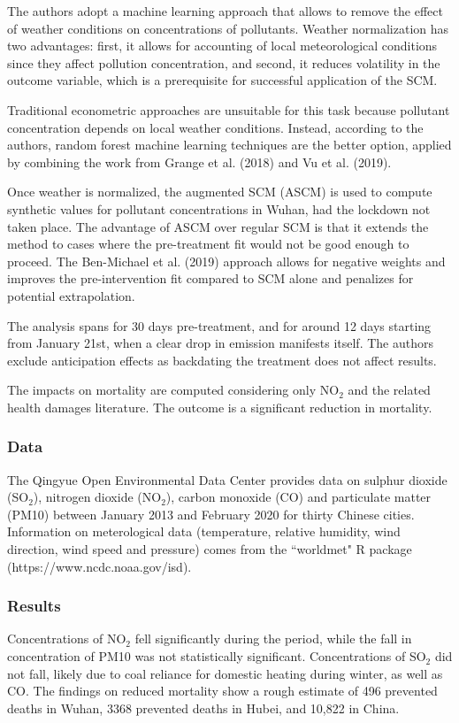 \documentclass[12pt,a4paper,draft]{article}
\begin{document}
The authors adopt a machine learning approach that allows to remove the effect of 
weather conditions on concentrations of pollutants. 
Weather normalization has two advantages: first, it allows for accounting of local 
meteorological conditions since they affect pollution concentration, and second, 
it reduces volatility in the outcome variable, which is a prerequisite for successful 
application of the SCM.

Traditional econometric approaches are unsuitable for this task
because pollutant concentration depends on local weather conditions. 
Instead, according to the authors, random forest machine learning techniques are 
the better option, applied by combining the work from Grange et al. (2018) and Vu et 
al. (2019).

Once weather is normalized, the augmented SCM (ASCM) is used to compute synthetic 
values for pollutant concentrations in Wuhan, had the lockdown not taken place. The 
advantage of ASCM over regular SCM is that it extends the method to cases where 
the pre-treatment fit would not be good enough to proceed. The Ben-Michael et al. (2019) 
approach allows for negative weights and improves the pre-intervention fit compared to 
SCM alone and penalizes for potential extrapolation. 

The analysis spans for 30 days pre-treatment, and for around 12 days starting from 
January 21st, when a clear drop in emission manifests itself. 
The authors exclude anticipation effects as backdating the treatment does not affect 
results. 

The impacts on mortality are computed considering only NO$_2$ and the related health 
damages literature. The outcome is a significant reduction in mortality. 


\subsubsection{Data}
The Qingyue Open Environmental Data Center provides data on sulphur dioxide (SO$_2$), 
nitrogen dioxide (NO$_2$), carbon monoxide (CO) and particulate matter (PM10) between 
January 2013 and February 2020 for thirty Chinese cities. Information on 
meterological data (temperature, relative humidity, wind direction, wind speed and 
pressure) comes from the ``worldmet" R package (https://www.ncdc.noaa.gov/isd).

\subsubsection{Results}
Concentrations of NO$_2$ fell significantly during the period, while the fall in 
concentration of PM10 was not statistically significant. Concentrations of SO$_2$ 
did not fall, likely due to coal reliance for domestic heating during 
winter, as well as CO. 
The findings on reduced mortality show a rough estimate of 496 prevented deaths in 
Wuhan, 3368 prevented deaths in Hubei, and 10,822 in China.
\end{document}
